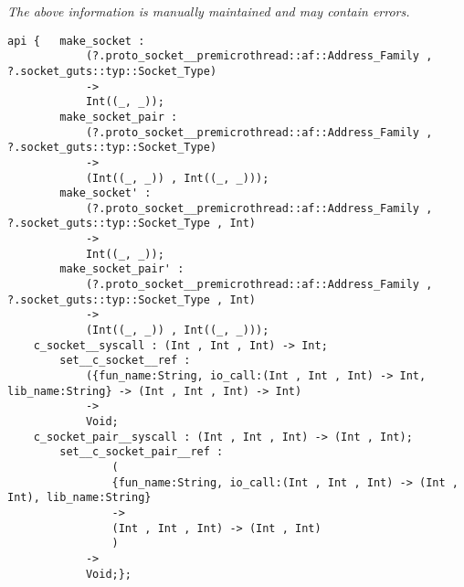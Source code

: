 \label{api:Plain\_Socket\_\_Premicrothread}

{\tiny \it The above information is manually maintained and may contain errors.}
\begin{verbatim}
api {   make_socket :
            (?.proto_socket__premicrothread::af::Address_Family , ?.socket_guts::typ::Socket_Type)
            ->
            Int((_, _));
        make_socket_pair :
            (?.proto_socket__premicrothread::af::Address_Family , ?.socket_guts::typ::Socket_Type)
            ->
            (Int((_, _)) , Int((_, _)));
        make_socket' :
            (?.proto_socket__premicrothread::af::Address_Family , ?.socket_guts::typ::Socket_Type , Int)
            ->
            Int((_, _));
        make_socket_pair' :
            (?.proto_socket__premicrothread::af::Address_Family , ?.socket_guts::typ::Socket_Type , Int)
            ->
            (Int((_, _)) , Int((_, _)));
    c_socket__syscall : (Int , Int , Int) -> Int;
        set__c_socket__ref :
            ({fun_name:String, io_call:(Int , Int , Int) -> Int, lib_name:String} -> (Int , Int , Int) -> Int)
            ->
            Void;
    c_socket_pair__syscall : (Int , Int , Int) -> (Int , Int);
        set__c_socket_pair__ref :
                (
                {fun_name:String, io_call:(Int , Int , Int) -> (Int , Int), lib_name:String}
                ->
                (Int , Int , Int) -> (Int , Int)
                )
            ->
            Void;};
\end{verbatim}
